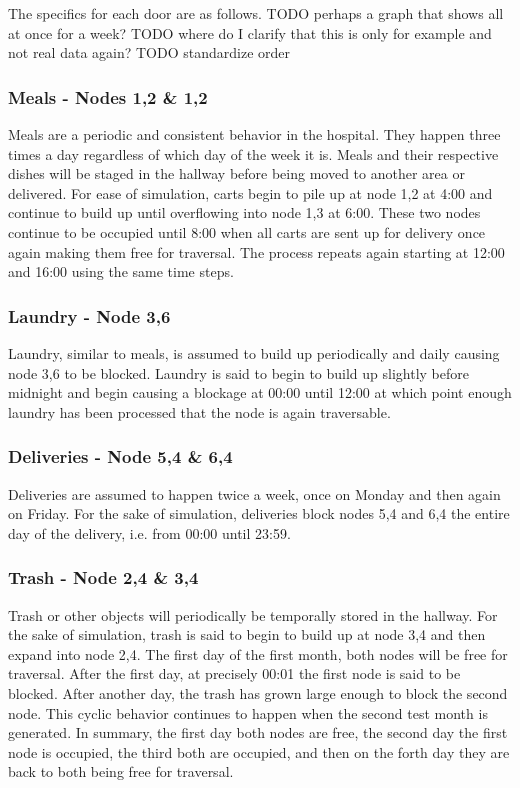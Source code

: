   The specifics for each door are as follows.
  TODO perhaps a graph that shows all at once for a week?
  TODO where do I clarify that this is only for example and not real data again?
  TODO standardize order

  \subsubsection{ Meals - Nodes 1,2 \& 1,2}

  Meals are a periodic and consistent behavior in the hospital. They happen
  three times a day regardless of which day of the week it is. Meals and their
  respective dishes will be staged in the hallway before being moved to
  another area or delivered. For ease of simulation, carts begin to pile up
  at node 1,2 at 4:00 and continue to build up until overflowing into node 1,3
  at 6:00. These two nodes continue to be occupied until 8:00 when all carts
  are sent up for delivery once again making them free for traversal. The
  process repeats again starting at 12:00 and 16:00 using the same time steps.

  \subsubsection{ Laundry - Node 3,6 }

  Laundry, similar to meals, is assumed to build up periodically and daily
  causing node 3,6 to be blocked. Laundry is said to begin to build up slightly
  before midnight and begin causing a blockage at 00:00 until 12:00 at which
  point enough laundry has been processed that the node is again traversable.

  \subsubsection{ Deliveries - Node 5,4 \& 6,4 }

  Deliveries are assumed to happen twice a week, once on Monday and then again
  on Friday. For the sake of simulation, deliveries block nodes 5,4 and 6,4
  the entire day of the delivery, i.e. from 00:00 until 23:59.

  \subsubsection{ Trash - Node 2,4 \& 3,4 }

  Trash or other objects will periodically be temporally stored in the hallway.
  For the sake of simulation, trash is said to begin to build up at node 3,4
  and then expand into node 2,4. The first day of the first month, both nodes
  will be free for traversal. After the first day, at precisely 00:01 the first
  node is said to be blocked. After another day, the trash has grown large
  enough to block the second node. This cyclic behavior continues to happen
  when the second test month is generated. In summary, the first day both nodes
  are free, the second day the first node is occupied, the third both are
  occupied, and then on the forth day they are back to both being free for
  traversal.

